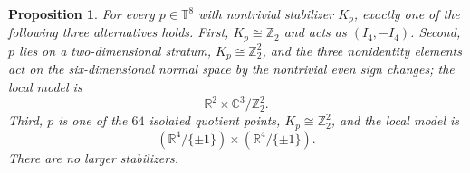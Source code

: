 \documentclass[11pt]{article}
\newtheorem{proposition}[theorem]{Proposition}
\theoremstyle{remark}\newtheorem{remark}[theorem]{Remark}
\newcommand{\T}{\mathbb T}
\newcommand{\R}{\mathbb R}
\newcommand{\C}{\mathbb C}
\newcommand{\Z}{\mathbb Z}
\begin{document}
\begin{proposition}\label{prop:isotropy}
For every $p\in\T^8$ with nontrivial stabilizer $K_p$, exactly one of the
following three alternatives holds.  First, $K_p\cong\Z_2$ and acts as
$(I_4,-I_4)$.  Second, $p$ lies on a two-dimensional stratum,
$K_p\cong\Z_2^2$, and the three nonidentity elements act on the
six-dimensional normal space by the nontrivial even sign changes; the
local model is
\begin{equation}\label{eq:SU3-local}\R^2\times\C^3/\Z_2^2.\end{equation}
Third, $p$ is one of the $64$ isolated quotient points,
$K_p\cong\Z_2^2$, and the local model is
\begin{equation}\label{eq:product-local}
(\R^4/\{\pm1\})\times(\R^4/\{\pm1\}).
\end{equation}
There are no larger stabilizers.
\end{proposition}
\end{document}
